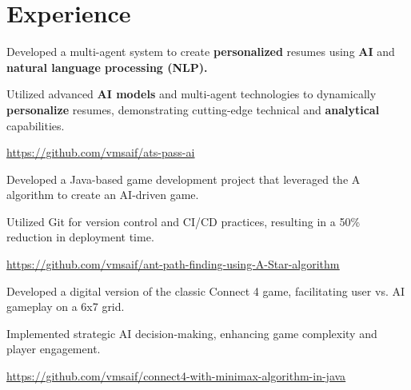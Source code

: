 \section{Experience}



\begin{tightemize}
    \item Developed a multi-agent system to create \textbf{personalized} resumes using \textbf{AI} and \textbf{natural language processing (NLP).}
    \item Utilized advanced \textbf{AI models} and multi-agent technologies to dynamically \textbf{personalize} resumes, demonstrating cutting-edge technical and \textbf{analytical} capabilities. 
    \item \href{https://github.com/vmsaif/ats-pass-ai}{\ul{https://github.com/vmsaif/ats-pass-ai}}
\end{tightemize}



\begin{tightemize}
    \item Developed a Java-based game development project that leveraged the A\* algorithm to create an AI-driven game.
    \item Utilized Git for version control and CI/CD practices, resulting in a 50\% reduction in deployment time.
    \item \href{https://github.com/vmsaif/ant-path-finding-using-A-Star-algorithm}{\ul{https://github.com/vmsaif/ant-path-finding-using-A-Star-algorithm}}
\end{tightemize}



\begin{tightemize}
    \item Developed a digital version of the classic Connect 4 game, facilitating user vs. AI gameplay on a 6x7 grid.
    \item Implemented strategic AI decision-making, enhancing game complexity and player engagement.
    \item \href{https://github.com/vmsaif/connect4-with-minimax-algorithm-in-java}{\ul{https://github.com/vmsaif/connect4-with-minimax-algorithm-in-java}}
\end{tightemize}